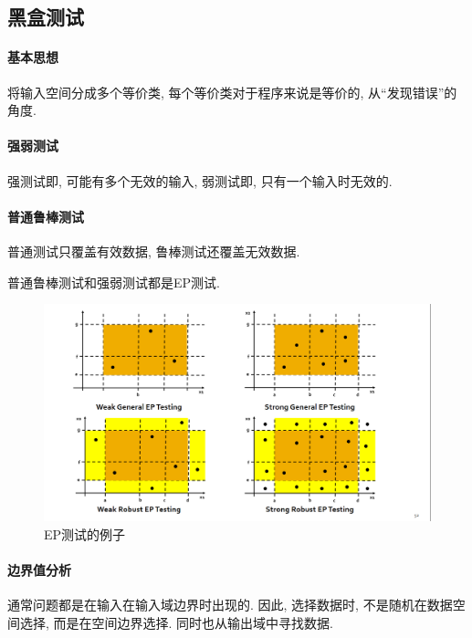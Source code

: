 \documentclass{ctexart}
\begin{document}
\subsection{黑盒测试}
\paragraph{基本思想} 将输入空间分成多个等价类, 每个等价类对于程序来说是等价的, 从``发现错误''的角度.
\paragraph{强弱测试} 强测试即, 可能有多个无效的输入, 弱测试即, 只有一个输入时无效的.
\paragraph{普通鲁棒测试} 普通测试只覆盖有效数据, 鲁棒测试还覆盖无效数据.\par
    普通鲁棒测试和强弱测试都是EP测试.
    \begin{figure}[ht!]
        \centering
        \includegraphics[width=\textwidth, height=\textheight, keepaspectratio]{eptest.png}
        \caption{EP测试的例子}
    \end{figure}

\paragraph{边界值分析} 通常问题都是在输入在输入域边界时出现的.
    因此, 选择数据时, 不是随机在数据空间选择, 而是在空间边界选择.
    同时也从输出域中寻找数据.\par
\end{document}

